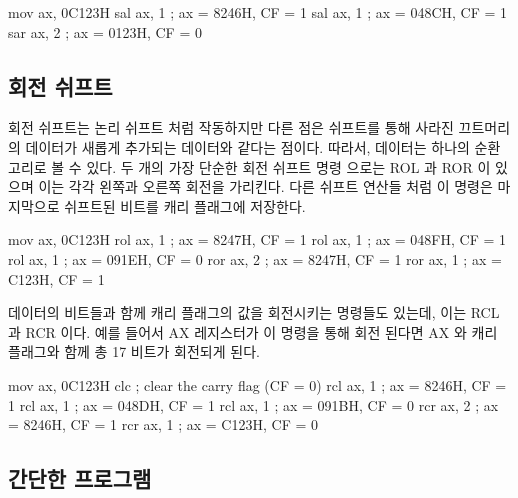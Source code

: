 \begin{AsmCodeListing}[frame=none]
      mov    ax, 0C123H
      sal    ax, 1           ; ax = 8246H, CF = 1
      sal    ax, 1           ; ax = 048CH, CF = 1
      sar    ax, 2           ; ax = 0123H, CF = 0
\end{AsmCodeListing}

\subsection{회전 쉬프트}

회전 쉬프트는 논리 쉬프트 처럼 작동하지만 다른 점은 쉬프트를 통해 사라진 
끄트머리의 데이터가 새롭게 추가되는 데이터와 같다는 점이다. 따라서, 데이터는 
하나의 순환 고리로 볼 수 있다. 두 개의 가장 단순한 회전 쉬프트 명령
으로는 {\code ROL}  과 {\code ROR}  이 있으며 이는 
각각 왼쪽과 오른쪽 회전을 가리킨다. 다른 쉬프트 연산들 처럼 이 명령은
마지막으로 쉬프트된 비트를 캐리 플래그에 저장한다. 

\begin{AsmCodeListing}[frame=none]
      mov    ax, 0C123H
      rol    ax, 1           ; ax = 8247H, CF = 1
      rol    ax, 1           ; ax = 048FH, CF = 1
      rol    ax, 1           ; ax = 091EH, CF = 0
      ror    ax, 2           ; ax = 8247H, CF = 1
      ror    ax, 1           ; ax = C123H, CF = 1
\end{AsmCodeListing}

데이터의 비트들과 함께 캐리 플래그의 값을 회전시키는 명령들도 있는데, 이는 {\code
RCL}  과 {\code RCR}  이다. 예를 들어서 {\code AX} 레지스터가
이 명령을 통해 회전 된다면 {\code AX} 와 캐리 플래그와 함께 총 17 비트가
회전되게 된다. 
\begin{AsmCodeListing}[frame=none]
      mov    ax, 0C123H
      clc                    ; clear the carry flag (CF = 0)
      rcl    ax, 1           ; ax = 8246H, CF = 1
      rcl    ax, 1           ; ax = 048DH, CF = 1
      rcl    ax, 1           ; ax = 091BH, CF = 0
      rcr    ax, 2           ; ax = 8246H, CF = 1
      rcr    ax, 1           ; ax = C123H, CF = 0
\end{AsmCodeListing}

\subsection{간단한 프로그램}\label{sect:AddBitsExample}

